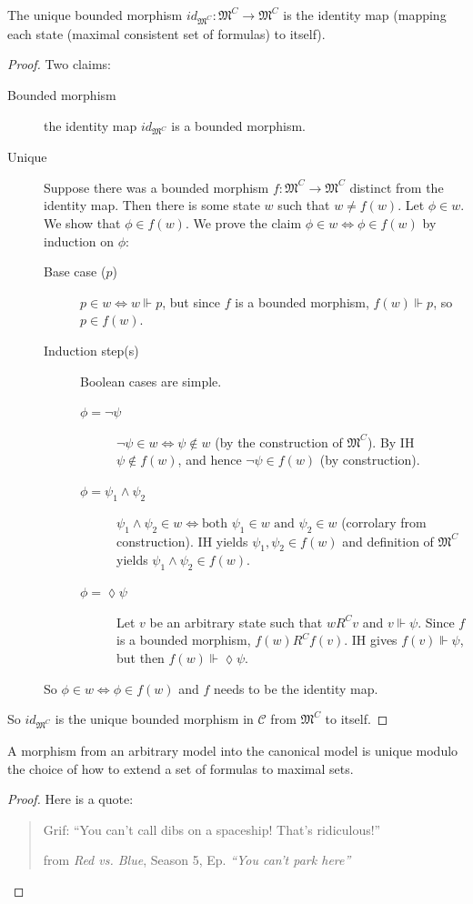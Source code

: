 \begin{proposition}
The unique bounded morphism $id_{\mathfrak M^C} : \mathfrak M^C \to \mathfrak M^C$ is the identity map (mapping each state (maximal consistent set of formulas) to itself).\end{proposition}


\begin{proof} Two claims:
\begin{description}
\item[Bounded morphism] the identity map $id_{\mathfrak M^C}$ is a bounded morphism.
\item[Unique] Suppose there was a bounded morphism $f : \mathfrak M^C \to \mathfrak M^C$ distinct from the identity map. Then there is some state $w$ such that $w \neq f(w)$. Let $\phi \in w$. We show that $\phi \in f(w)$. We prove the claim $\phi \in w \Leftrightarrow \phi \in f(w)$ by induction on $\phi$:
\begin{description}
\item[Base case ($p$)] $p \in w \Leftrightarrow w \Vdash p$, but since $f$ is a bounded morphism, $f(w) \Vdash p$, so $p \in f(w)$.
\item[Induction step(s)] Boolean cases are simple.
\begin{description}
\item[$\phi = \neg \psi$] $\neg \psi \in w \Leftrightarrow \psi \notin w$ (by the construction of $\mathfrak M^C$). By IH $\psi \notin f(w)$, and hence $\neg \psi \in f(w)$ (by construction).
\item[$\phi = \psi_1 \wedge \psi_2$] $\psi_1 \wedge \psi_2 \in w \Leftrightarrow \text{both } \psi_1 \in w \text{ and } \psi_2 \in w$ (corrolary from construction). IH yields $\psi_1,\psi_2 \in f(w)$ and definition of $\mathfrak M^C$ yields $\psi_1 \wedge \psi_2 \in f(w)$.
\item[$\phi = \lozenge \psi$] Let $v$ be an arbitrary state such that $wR^Cv$ and $v \Vdash \psi$. Since $f$ is a bounded morphism, $f(w)R^Cf(v)$. IH gives $f(v) \Vdash \psi$, but then $f(w)\Vdash \lozenge \psi$.
\end{description}
\end{description}
So $\phi \in w \Leftrightarrow \phi \in f(w)$ and $f$ needs to be the identity map.
\end{description}
So $id_{\mathfrak M^C}$ is the unique bounded morphism in $\mathcal C$ from $\mathfrak M^C$ to itself.
\end{proof}

A morphism from an arbitrary model into the canonical model is unique modulo the choice of how to extend a set of formulas to maximal sets.
\begin{proof} Here is a quote:
\begin{quote}
Grif: ``You can't call dibs on a spaceship! That's ridiculous!''
\begin{flushright}
from \textit{Red vs. Blue}, Season 5, Ep. \textit{``You can't park here''}
\end{flushright}
\end{quote}
\end{proof}

